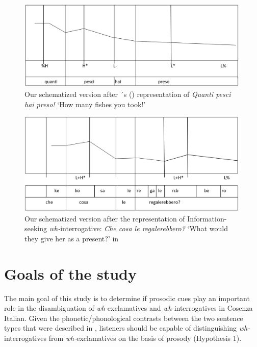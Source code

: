 \documentclass[output=paper]{langsci/langscibook}
\begin{document}
\begin{figure}

\includegraphics[width=0.99\textwidth]{figures/KEL-img1.PNG}
\caption{Our schematized version after \citeauthor{Sorianello2011exclamative}´s (\citeyear[316]{Sorianello2011exclamative}) representation of \textit{Quanti pesci hai preso!} ‘How many fishes you took!’}
\label{fig:kel:1}
\end{figure}


\begin{figure}
\includegraphics[width=0.99\textwidth]{figures/KEL-img2.PNG}
\caption{Our schematized version after the representation of Information-seeking \textit{wh-}interrogative: \textit{Che cosa le regalerebbero?} ‘What would they give her as a present?’ in \citep[182]{GiliFivelaETAL2015intonationalvariation}}
\label{fig:kel:2}
\end{figure}


\section{Goals of the study}
\label{sec:kel:3}

The main goal of this study is to determine if prosodic cues play an important role in the disambiguation of \textit{wh-}exclamatives and \textit{wh-}interrogatives in Cosenza Italian. Given the phonetic/phonological contrasts between the two sentence types that were described in , listeners should be capable of distinguishing \textit{wh-}interrogatives from \textit{wh-}exclamatives on the basis of prosody (Hypothesis 1).
\end{document}
